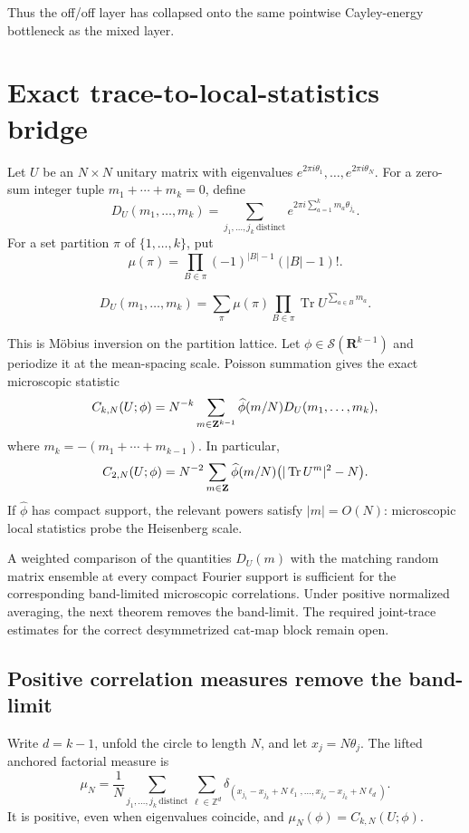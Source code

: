 Thus the off/off layer has collapsed onto the same pointwise Cayley-energy
bottleneck as the mixed layer.

\section{Exact trace-to-local-statistics bridge}

Let $U$ be an $N\times N$ unitary matrix with eigenvalues
$e^{2\pi i\theta_1},\ldots,e^{2\pi i\theta_N}$.  For a zero-sum integer tuple
$m_1+\cdots+m_k=0$, define
\[
D_U(m_1,\ldots,m_k)
 =\sum_{j_1,\ldots,j_k\ \mathrm{distinct}}
 e^{2\pi i\sum_{a=1}^km_a\theta_{j_a}}.
\]
For a set partition $\pi$ of $\{1,\ldots,k\}$, put
\[
\mu(\pi)=\prod_{B\in\pi}(-1)^{|B|-1}(|B|-1)!.
\]

\begin{theorem}\label{thm:factorial}
\begin{equation}\label{eq:factorial}
D_U(m_1,\ldots,m_k)
 =\sum_{\pi}\mu(\pi)
   \prod_{B\in\pi}
   \operatorname{Tr}U^{\sum_{a\in B}m_a}.
\end{equation}
\end{theorem}

This is M\"obius inversion on the partition lattice.  Let
$\phi\in\mathcal S(\mathbf R^{k-1})$ and periodize it at the mean-spacing scale.
Poisson summation gives the exact microscopic statistic
\begin{equation}\label{eq:trace-local}
C_{k,N}(U;\phi)
 =N^{-k}\sum_{m\in\mathbf Z^{k-1}}
  \widehat\phi(m/N)D_U(m_1,\ldots,m_k),
\end{equation}
where $m_k=-(m_1+\cdots+m_{k-1})$.  In particular,
\begin{equation}\label{eq:pair-local}
C_{2,N}(U;\phi)
 =N^{-2}\sum_{m\in\mathbf Z}\widehat\phi(m/N)
  \bigl(|\operatorname{Tr}U^m|^2-N\bigr).
\end{equation}
If $\widehat\phi$ has compact support, the relevant powers satisfy
$|m|=O(N)$: microscopic local statistics probe the Heisenberg scale.

A weighted comparison of the quantities $D_U(m)$ with the matching random
matrix ensemble at every compact Fourier support is sufficient for the
corresponding band-limited microscopic correlations. Under positive normalized
averaging, the next theorem removes the band-limit. The required joint-trace
estimates for the correct desymmetrized cat-map block remain open.

\subsection{Positive correlation measures remove the band-limit}
Write $d=k-1$, unfold the circle to length $N$, and let $x_j=N\theta_j$.
The lifted anchored factorial measure is
\[
 \mu_N=\frac1N\sum_{j_1,\ldots,j_k\ \mathrm{distinct}}
 \sum_{\ell\in\mathbb Z^d}
 \delta_{(x_{j_1}-x_{j_k}+N\ell_1,\ldots,x_{j_d}-x_{j_k}+N\ell_d)}.
\]
It is positive, even when eigenvalues coincide, and
$\mu_N(\phi)=C_{k,N}(U;\phi)$.

